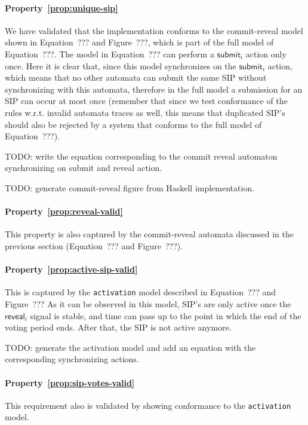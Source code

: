 \paragraph{Property~\ref{prop:unique-sip}} We have validated that the
implementation conforms to the commit-reveal model shown in Equation~??? and
Figure~???, which is part of the full model of Equation~???. The model in
Equation~??? can perform a $\mathsf{submit}_i$ action only once. Here it is
clear that, since this model synchronizes on the $\mathsf{submit}_i$ action,
which means that no other automata can submit the same SIP without synchronizing
with this automata, therefore in the full model a submission for an SIP can
occur at most once (remember that since we test conformance of the rules w.r.t.
invalid automata traces as well, this means that duplicated SIP's should also be
rejected by a system that conforms to the full model of Equation~???).

TODO: write the equation corresponding to the commit reveal automaton
synchronizing on submit and reveal action.

TODO: generate commit-reveal figure from Haskell implementation.

\paragraph{Property~\ref{prop:reveal-valid}} This property is also captured by
the commit-reveal automata discussed in the previous section (Equation~??? and
Figure~???).

\paragraph{Property~\ref{prop:active-sip-valid}} This is captured by the
\texttt{activation} model described in Equation~??? and Figure~??? As it can be
observed in this model, SIP's are only active once the $\mathsf{reveal}_i$
signal is stable, and time can pass up to the point in which the end of the
voting period ends. After that, the SIP is not active anymore.

TODO: generate the activation model and add an equation with the corresponding
synchronizing actions.

\paragraph{Property~\ref{prop:sip-votes-valid}} This requirement also is
validated by showing conformance to the \texttt{activation} model.

